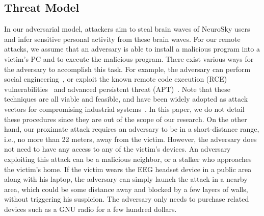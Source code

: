 \subsection{Threat Model}
In our adversarial model, attackers aim to steal brain waves of NeuroSky users and infer sensitive personal activity from these brain waves. For our remote attacks, we assume that an adversary is able to install a malicious program into a victim's PC and to execute the malicious program. There exist various ways for the adversary to accomplish this task. For example, the adversary can perform social engineering~\cite{socialengineering}, or exploit the known remote code execution (RCE) vulnerabilities~\cite{rce} and advanced persistent threat (APT)~\cite{apt}. Note that these techniques are all viable and feasible, and have been widely adopted as attack vectors for compromising industrial systems~\cite{socialengieerstat}\cite{aptstat}\cite{vulstat}. In this paper, we do not detail these procedures since they are out of the scope of our research. On the other hand, our proximate attack requires an adversary to be in a short-distance range, i.e., no more than 22 meters, away from the victim. However, the adversary does not need to have any access to any of the victim's devices. An adversary exploiting this attack can be a malicious neighbor, or a stalker who approaches the victim's home. If the victim wears the EEG headset device in a public area along with his laptop, the adversary can simply launch the attack in a nearby area, which could be some distance away and blocked by a few layers of walls, without triggering his suspicion. The adversary only needs to purchase related devices such as a GNU radio for a few hundred dollars.

